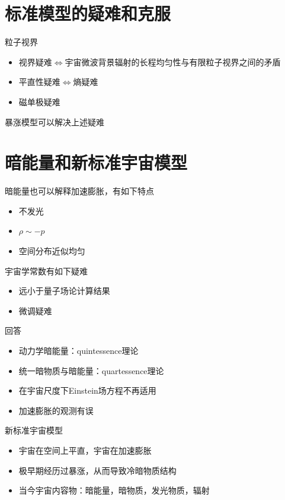 \section{标准模型的疑难和克服}

粒子视界
\begin{itemize}
    \item 视界疑难$\iff$宇宙微波背景辐射的长程均匀性与有限粒子视界之间的矛盾
    \item 平直性疑难$\iff$熵疑难
    \item 磁单极疑难
\end{itemize}
暴涨模型可以解决上述疑难

\section{暗能量和新标准宇宙模型}

暗能量也可以解释加速膨胀，有如下特点
\begin{itemize}
    \item 不发光
    \item $\rho \sim -p$
    \item 空间分布近似均匀
\end{itemize}

宇宙学常数有如下疑难
\begin{itemize}
    \item 远小于量子场论计算结果
    \item 微调疑难
\end{itemize}

回答
\begin{itemize}
    \item 动力学暗能量：quintessence理论
    \item 统一暗物质与暗能量：quartessence理论
    \item 在宇宙尺度下Einstein场方程不再适用
    \item 加速膨胀的观测有误
\end{itemize}

新标准宇宙模型
\begin{itemize}
    \item 宇宙在空间上平直，宇宙在加速膨胀
    \item 极早期经历过暴涨，从而导致冷暗物质结构
    \item 当今宇宙内容物：暗能量，暗物质，发光物质，辐射
\end{itemize}